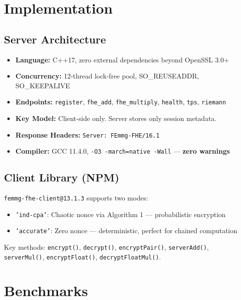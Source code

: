 \documentclass{article}
\begin{document}
\section{Implementation}

\subsection{Server Architecture}

\begin{itemize}
    \item \textbf{Language:} C++17, zero external dependencies beyond OpenSSL 3.0+
    \item \textbf{Concurrency:} 12-thread lock-free pool, SO\_REUSEADDR, SO\_KEEPALIVE
    \item \textbf{Endpoints:} \texttt{register}, \texttt{fhe\_add}, \texttt{fhe\_multiply}, \texttt{health}, \texttt{tps}, \texttt{riemann}
    \item \textbf{Key Model:} Client-side only. Server stores only session metadata.
    \item \textbf{Response Headers:} \texttt{Server: FEmmg-FHE/16.1}
    \item \textbf{Compiler:} GCC 11.4.0, \texttt{-O3 -march=native -Wall} — \textbf{zero warnings}
\end{itemize}

\subsection{Client Library (NPM)}

\texttt{femmg-fhe-client@13.1.3} supports two modes:
\begin{itemize}
    \item \texttt{'ind-cpa'}: Chaotic nonce via Algorithm 1 — probabilistic encryption
    \item \texttt{'accurate'}: Zero nonce — deterministic, perfect for chained computation
\end{itemize}

Key methods: \texttt{encrypt()}, \texttt{decrypt()}, \texttt{encryptPair()}, \texttt{serverAdd()}, \texttt{serverMul()}, \texttt{encryptFloat()}, \texttt{decryptFloatMul()}.

\section{Benchmarks}
\end{document}
